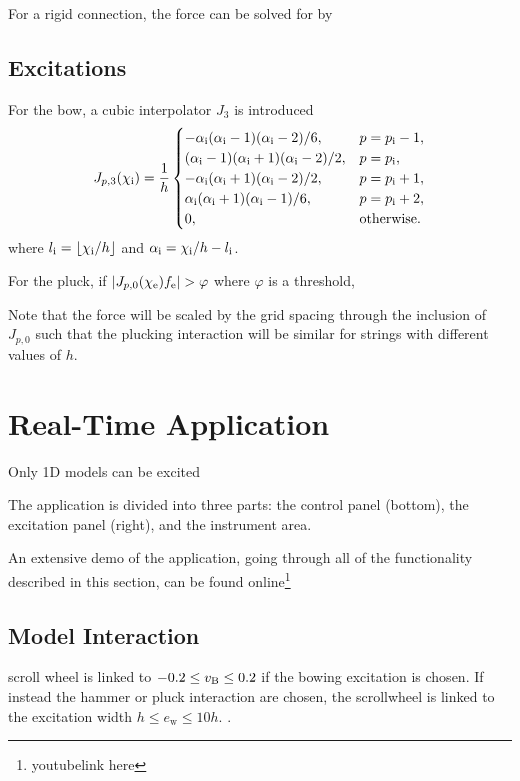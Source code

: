 \documentclass{article}
\begin{document}
For a rigid connection, the force can be solved for by 

\subsection{Excitations}\label{sec:discExcitations}
For the bow, a cubic interpolator $J_3$ is introduced
\begin{equation}\label{eq:cubicJ}
    J_{p,3}(\chi_{\text{i}}) = \frac{1}{h}\begin{cases}
        -\alpha_{\text{i}} (\alpha_{\text{i}}-1)(\alpha_{\text{i}}-2)/6, & p = p_{\text{i}}-1,\\
        (\alpha_{\text{i}}-1)(\alpha_{\text{i}}+1)(\alpha_{\text{i}}-2)/2,  & p = p_{\text{i}},\\
        -\alpha_{\text{i}} (\alpha_{\text{i}}+1)(\alpha_{\text{i}}-2)/2, & p = p_{\text{i}} + 1,\\
        \alpha_{\text{i}} (\alpha_{\text{i}}+1)(\alpha_{\text{i}}-1)/6, & p = p_{\text{i}} + 2,\\
        0, & \text{otherwise.}
    \end{cases}
\end{equation}
where $l_\itxt = \floor[\chi_\itxt / h]$ and $\alpha_{\text{i}} = \chi_{\text{i}} /h - l_{\text{i}}$.


For the pluck, if $|J_{p, 0}(\chi_{\text{e}}) f_{\text{e}}| > \varphi$ where $\varphi$ is a threshold, 

Note that the force will be scaled by the grid spacing through the inclusion of $J_{p, 0}$ such that the plucking interaction will be similar for strings with different values of $h$. 

\section{Real-Time Application}
Only 1D models can be excited

The application is divided into three parts: the control panel (bottom), the excitation panel (right), and the instrument area. 

An extensive demo of the application, going through all of the functionality described in this section, can be found online\footnote{youtubelink here}

\subsection{Model Interaction}
scroll wheel is linked to $-0.2 \leq v_{\text{B}} \leq 0.2$ if the bowing excitation is chosen. If instead the hammer or pluck interaction are chosen, the scrollwheel is linked to the excitation width $h \leq e_\text{w} \leq 10 h$. . 
\end{document}
